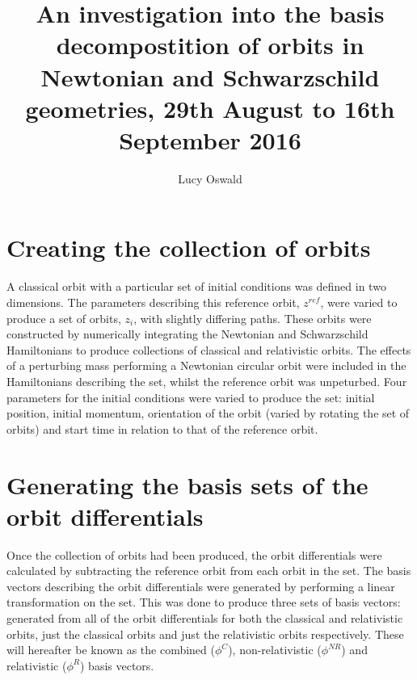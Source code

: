 \documentclass[11pt,a4paper]{article}
\begin{document}

\title{\textbf{An investigation into the basis decompostition of orbits in Newtonian and Schwarzschild geometries, 29th August to 16th September 2016}}
\author{Lucy Oswald}
\date{}
\maketitle


\section{Creating the collection of orbits}

A classical orbit with a particular set of initial conditions was defined in two dimensions. The parameters describing this reference orbit, $z^{ref}$, were varied to produce a set of orbits, $z_{i}$, with slightly differing paths. These orbits were constructed by numerically integrating the Newtonian and Schwarzschild Hamiltonians to produce collections of classical and relativistic orbits. The effects of a perturbing mass performing a Newtonian circular orbit were included in the Hamiltonians describing the set, whilst the reference orbit was unpeturbed. Four parameters for the initial conditions were varied to produce the set: initial position, initial momentum, orientation of the orbit (varied by rotating the set of orbits) and start time in relation to that of the reference orbit.

\section{Generating the basis sets of the orbit differentials}

Once the collection of orbits had been produced, the orbit differentials were calculated by subtracting the reference orbit from each orbit in the set. The basis vectors describing the orbit differentials were generated by performing a linear transformation on the set. This was done to produce three sets of basis vectors: generated from all of the orbit differentials for both the classical and relativistic orbits, just the classical orbits and just the relativistic orbits respectively. These will hereafter be known as the combined ($\phi^C$), non-relativistic ($\phi^{NR}$) and relativistic ($\phi^R$) basis vectors.
\end{document}
